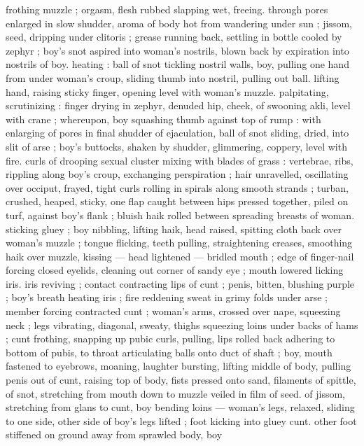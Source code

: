 frothing muzzle ; orgasm, flesh rubbed slapping wet, freeing. 
through pores enlarged in slow shudder, aroma of body hot from 
wandering under sun ; jissom, seed, dripping under clitoris ; grease 
running back, settling in bottle cooled by zephyr ; boy's snot aspired 
into woman's nostrils, blown back by expiration into nostrils of boy. 
heating : ball of snot tickling nostril walls, boy, pulling one hand from 
under woman's croup, sliding thumb into nostril, pulling out ball. 
lifting hand, raising sticky finger, opening level with woman's muzzle. 
palpitating, scrutinizing : finger drying in zephyr, denuded hip, 
cheek, of swooning akli, level with crane ; whereupon, boy squashing 
thumb against top of rump : with enlarging of pores in final shudder 
of ejaculation, ball of snot sliding, dried, into slit of arse ; boy's 
buttocks, shaken by shudder, glimmering, coppery, level with fire. 
curls of drooping sexual cluster mixing with blades of grass : 
vertebrae, ribs, rippling along boy's croup, exchanging perspiration 
; hair unravelled, oscillating over occiput, frayed, tight curls rolling in 
spirals along smooth strands ; turban, crushed, heaped, sticky, one 
flap caught between hips pressed together, piled on turf, against 
boy's flank ; bluish haik rolled between spreading breasts of woman. 
sticking gluey ; boy nibbling, lifting haik, head raised, spitting cloth 
back over woman's muzzle ; tongue flicking, teeth pulling, 
straightening creases, smoothing haik over muzzle, kissing --- head 
lightened --- bridled mouth ; edge of finger-nail forcing closed 
eyelids, cleaning out corner of sandy eye ; mouth lowered licking iris. 
iris reviving ; contact contracting lips of cunt ; penis, bitten, blushing 
purple ; boy's breath heating iris ; fire reddening sweat in grimy folds 
under arse ; member forcing contracted cunt ; woman's arms, 
crossed over nape, squeezing neck ; legs vibrating, diagonal, sweaty, 
thighs squeezing loins under backs of hams ; cunt frothing, snapping 
up pubic curls, pulling, lips rolled back adhering to bottom of pubis, 
to throat articulating balls onto duct of shaft ; boy, mouth fastened 
to eyebrows, moaning, laughter bursting, lifting middle of body, 
pulling penis out of cunt, raising top of body, fists pressed onto 
sand, filaments of spittle, of snot, stretching from mouth down to 
muzzle veiled in film of seed. of jissom, stretching from glans to 
cunt, boy bending loins --- woman's legs, relaxed, sliding to one 
side, other side of boy's legs lifted ; foot kicking into gluey cunt. 
other foot stiffened on ground away from sprawled body, boy 
